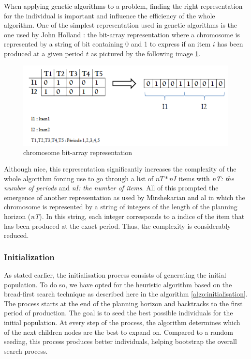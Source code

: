 \documentclass[twocolumn,10pt]{asme2ej}
\begin{document}
When applying genetic algorithms to a problem, finding the right representation for the individual is important and influence the efficiency of the whole algorithm. One of the simplest representation used in genetic algorithms is the one used by John Holland \cite{jh_paper} : the bit-array representation where a chromosome is represented by a string of bit containing 0 and 1 to express if an item $i$ has been produced at a given period $t$ as pictured by the following image \ref{fig:chromRepr}.

\begin{figure}[h]
    \centering
    \includegraphics[scale=.3]{figure/chrom_repr.png}
    \caption{chromosome bit-array representation}
    \label{fig:chromRepr}
\end{figure}

Although nice, this representation significantly increases the complexity of the whole algorithm forcing use to go through a list of $nT * nI$ items with \emph{nT: the number of periods} and \emph{nI: the number of items}. All of this prompted the emergence of another representation as used by Mirshekarian and al \cite{non_binary_paper} in which the chromosome is represented by a string of integers of the length of the planning horizon (\emph{nT}). In this string, each integer corresponds to a indice of the item that has been produced at the exact period. Thus, the complexity is considerably reduced.  

\subsubsection{Initialization}

As stated earlier, the initialisation process consists of generating the initial population. To do so, we have opted for the heuristic algorithm based on the bread-first search technique as described here in the algorithm \ref{algo:initialisation}. The process starts at the end of the planning horizon and backtracks to the first period of production. The goal is to seed the best possible individuals for the initial population. At every step of the process, the algorithm determines which of the next children nodes are the best to expand on. Compared to a random seeding, this process produces better individuals, helping bootstrap the overall search process.
\end{document}
